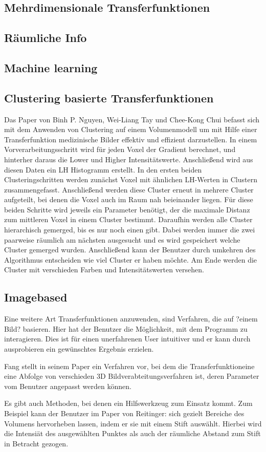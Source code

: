 \subsection{Mehrdimensionale Transferfunktionen}
\subsection{Räumliche Info}
\subsection{Machine learning}
\subsection{Clustering basierte Transferfunktionen}


Das Paper von Binh P. Nguyen, Wei-Liang Tay und Chee-Kong Chui \cite{nguyen2012clustering} befasst sich mit dem Anwenden von Clustering auf einem Volumenmodell um mit Hilfe einer Transferfunktion medizinische Bilder effektiv und effizient darzustellen.
In einem Vorverarbeitungsschritt wird für jeden Voxel der Gradient berechnet, und hinterher daraus die Lower und Higher Intensitätswerte. Anschließend wird aus diesen Daten ein LH Histogramm erstellt.
In den ersten beiden Clusteringschritten werden zunächst Voxel mit ähnlichen  LH-Werten in Clustern zusammengefasst. Anschließend werden diese Cluster erneut in mehrere Cluster aufgeteilt, bei denen die Voxel auch im Raum nah beieinander liegen. Für diese beiden Schritte wird jeweils ein Parameter benötigt, der die maximale Distanz zum mittleren Voxel in einem Cluster bestimmt. Daraufhin werden alle Cluster hierarchisch gemerged, bis es nur noch einen gibt. Dabei werden immer die zwei paarweise räumlich am nächsten ausgesucht und es wird gespeichert welche Cluster gemerged wurden. Anschließend kann der Benutzer durch umkehren des Algorithmus entscheiden wie viel Cluster er haben möchte. Am Ende werden die Cluster mit verschieden Farben und Intensitätswerten versehen.

\subsection{Imagebased}
Eine weitere Art Transferfunktionen anzuwenden, sind Verfahren, die auf ?einem Bild? basieren. Hier hat der Benutzer die Möglichkeit, mit dem Programm zu interagieren. Dies ist für einen unerfahrenen User intuitiver und er kann durch ausprobieren ein gewünschtes Ergebnis erzielen.

Fang stellt in seinem Paper \cite{fang1998image} ein Verfahren vor, bei dem die  Transferfunktioneine eine Abfolge von verschieden 3D Bildverabteitungsverfahren ist, deren Parameter vom Benutzer angepasst werden können.

Es gibt auch Methoden, bei denen ein Hilfswerkzeug zum Einsatz kommt. Zum Beispiel kann der Benutzer im Paper von Reitinger: \cite{reitinger2004user} sich gezielt Bereiche des Volumens hervorheben lassen, indem er sie mit einem Stift auswählt. Hierbei wird die Intensiät des ausgewählten Punktes als auch der räumliche Abstand zum Stift in Betracht gezogen.


